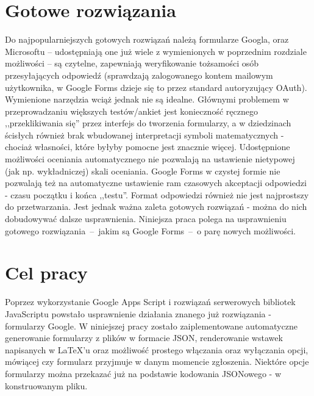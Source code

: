 \section{Gotowe rozwiązania}
Do najpopularniejszych gotowych rozwiązań należą formularze Googla, oraz Microsoftu -- udostępniają one już wiele z  wymienionych w poprzednim rozdziale możliwości -- są czytelne, zapewniają weryfikowanie  tożsamości osób przesyłających odpowiedź (sprawdzają zalogowanego kontem mailowym użytkownika, w Google Forms dzieje się  to przez standard autoryzujący OAuth).
\ind Wymienione narzędzia wciąż jednak nie są idealne. Głównymi problemem w przeprowadzaniu większych testów/ankiet jest konieczność ręcznego ,,przeklikiwania się'' przez interfejs do tworzenia formularzy, a w dziedzinach ścisłych również brak wbudowanej interpretacji symboli matematycznych - chociaż własności, które byłyby pomocne jest znacznie więcej. Udostępnione możliwości oceniania automatycznego nie pozwalają na ustawienie nietypowej (jak np. wykładniczej) skali oceniania. Google Forms w czystej formie nie pozwalają też na automatyczne ustawienie ram czasowych akceptacji odpowiedzi - czasu początku i końca ,,testu''. Format odpowiedzi również nie jest najprostszy do przetwarzania.
\ind Jest jednak ważna zaleta gotowych rozwiązań - można do nich dobudowywać dalsze usprawnienia. Niniejsza praca polega na usprawnieniu gotowego rozwiązania~--~jakim są Google Forms~--~o parę nowych możliwości.
\section{Cel pracy}
 Poprzez wykorzystanie Google Apps Script  i rozwiązań serwerowych bibliotek JavaScriptu powstało  usprawnienie działania znanego już rozwiązania - formularzy Google. W niniejszej pracy zostało zaiplementowane automatyczne generowanie formularzy z plików w formacie JSON, renderowanie wstawek napisanych w \LaTeX{}'u oraz możliwość prostego włączania oraz wyłączania opcji, mówiącej czy formularz przyjmuje w danym momencie zgłoszenia. Niektóre opcje formularzy można  przekazać już na podstawie kodowania JSONowego - w konstruowanym pliku.

